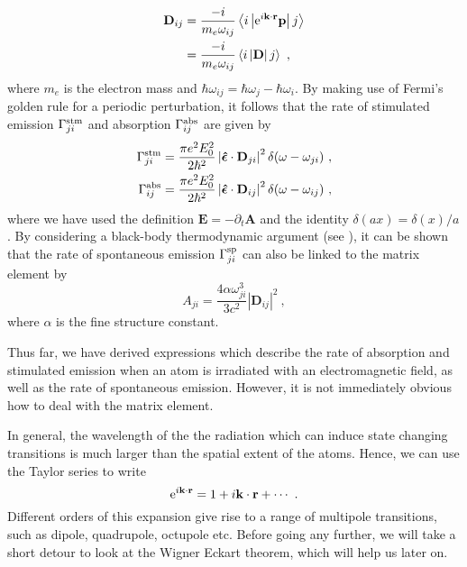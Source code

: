 \documentclass{article}
\begin{document}
\begin{align}
    \mathbf{D}_{ij} &= \frac{-i}{m_e\omega_{ij}}\left\langle i \left|{\rm{e}}^{i\mathbf{k}\cdot\mathbf{r}} \mathbf{p} \right| j\right\rangle \\
    &= \frac{-i}{m_e\omega_{ij}}\left\langle i \left|\mathbf{D} \right| j\right\rangle~,
\end{align}
where $m_e$ is the electron mass and $\hbar\omega_{ij} = \hbar\omega_j - \hbar\omega_i$. 
By making use of Fermi's golden rule for a periodic perturbation, it follows that the rate of stimulated emission $\Gamma^{\rm{stm}}_{ji}$ and absorption $\Gamma^{\rm{abs}}_{ij}$ are given by 
\begin{align}
    \Gamma^{\rm{stm}}_{ji} &= \frac{\pi e^2 E_0^2}{2\hbar^2}\left|\boldsymbol{\hat{\epsilon}}\cdot\mathbf{D}_{ji}\right|^2\delta(\omega-\omega_{ji})~, \\
    \Gamma^{\rm{abs}}_{ij} &= \frac{\pi e^2 E_0^2}{2\hbar^2}\left|\boldsymbol{\hat{\epsilon}}\cdot\mathbf{D}_{ij}\right|^2\delta(\omega-\omega_{ij})~,
\end{align}
where we have used the definition $\mathbf{E} = -\partial _t \mathbf{A}$ and the identity $\delta(ax) = \delta(x)/a$. By considering a black-body thermodynamic argument (see \cite{Loudon2000, Foot2005}), it can be shown that the rate of spontaneous emission $\Gamma^{\rm{sp}}_{ji}$ can also be linked to the matrix element by
\begin{equation} \label{eq:spont_emiss}
    A_{ji} = \frac{4\alpha \omega_{ji}^3}{3c^2}\left|\mathbf{D}_{ij}\right|^2~,
\end{equation}
where $\alpha$ is the fine structure constant. 

Thus far, we have derived expressions which describe the rate of absorption and stimulated emission when an atom is irradiated with an electromagnetic field, as well as the rate of spontaneous emission. However, it is not immediately obvious how to deal with the matrix element.   

In general, the wavelength of the the radiation which can induce state changing transitions is much larger than the 
spatial extent of the atoms. Hence, we can use the Taylor series to write \begin{equation}\label{eq:multipole}
    {\rm{e}}^{i\mathbf{k}\cdot\mathbf{r}} = 1 + i \mathbf{k} \cdot \mathbf{r} + \cdots~.
\end{equation}
Different orders of this expansion give rise to a range of multipole transitions, such as dipole, quadrupole, octupole etc. Before going any further, we will take a short detour to look at the Wigner Eckart theorem, which will help us later on. 
\end{document}
